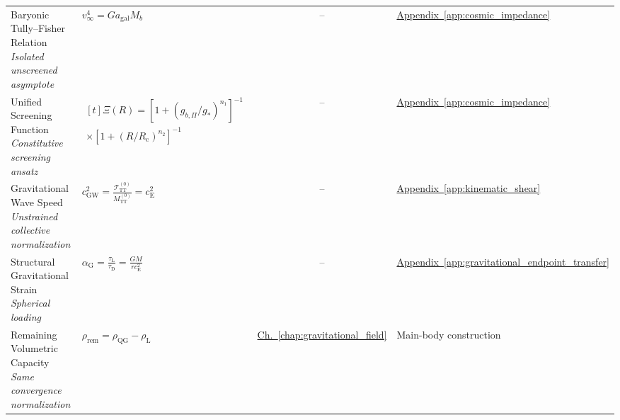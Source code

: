 \begin{longtable}{@{} p{4.5cm} p{6cm} c p{4cm} @{}}
{\raggedright Baryonic Tully--Fisher Relation \newline \textit{Isolated unscreened asymptote}\par} & {\raggedright $v_\infty^4 = G a_{\mathrm{gal}} M_b$\par} & -- & {\raggedright \hyperref[app:cosmic_impedance]{Appendix~\ref*{app:cosmic_impedance}}\par} \\

{\raggedright Unified Screening Function \newline \textit{Constitutive screening ansatz}\par} & {\raggedright $\begin{gathered}[t]\Xi(R)=\left[1+(g_{b,\Pi}/g_*)^{n_1}\right]^{-1} \\ \times\left[1+(R/R_{\mathrm c})^{n_2}\right]^{-1}\end{gathered}$\par} & -- & {\raggedright \hyperref[app:cosmic_impedance]{Appendix~\ref*{app:cosmic_impedance}}\par} \\

{\raggedright Gravitational Wave Speed \newline \textit{Unstrained collective normalization}\par} & {\raggedright $c_{\mathrm{GW}}^2=\frac{\mathcal T_{\mathrm{TT}}^{(0)}}{M_{\mathrm{TT}}^{(0)}}=c_{\mathrm E}^2$\par} & -- & {\raggedright \hyperref[app:kinematic_shear]{Appendix~\ref*{app:kinematic_shear}}\par} \\

{\raggedright Structural Gravitational Strain \newline \textit{Spherical loading}\par} & {\raggedright $\alpha_{\mathrm G}=\frac{\tau_{\mathrm L}}{\tau_{\mathrm D}}=\frac{GM}{rc_{\mathrm E}^2}$\par} & -- & {\raggedright \hyperref[app:gravitational_endpoint_transfer]{Appendix~\ref*{app:gravitational_endpoint_transfer}}\par} \\

{\raggedright Remaining Volumetric Capacity \newline \textit{Same convergence normalization}\par} & {\raggedright $\rho_{\mathrm{rem}}=\rho_{\mathrm{QG}}-\rho_{\mathrm L}$\par} & \hyperref[chap:gravitational_field]{Ch.~\ref*{chap:gravitational_field}} & {\raggedright Main-body construction\par} \\


\end{longtable}
